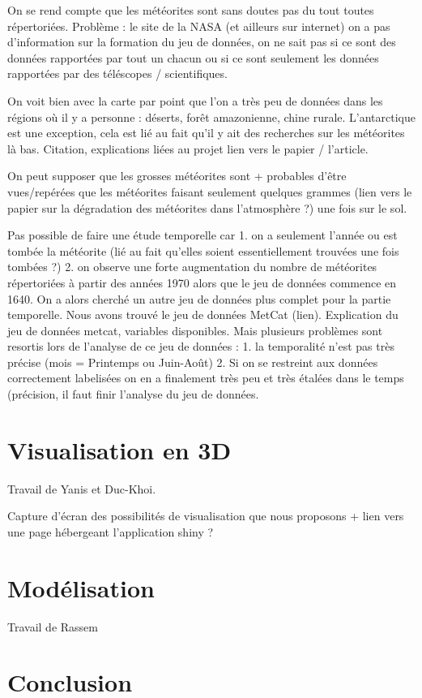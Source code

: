 \documentclass[12pt]{article}
\begin{document}
On se rend compte que les météorites sont sans doutes pas du tout toutes répertoriées. Problème : le site de la NASA (et ailleurs sur internet) on a pas d'information sur la formation du jeu de données, on ne sait pas si ce sont des données rapportées par tout un chacun ou si ce sont seulement les données rapportées par des téléscopes / scientifiques. 

On voit bien avec la carte par point que l'on a très peu de données dans les régions où il y a personne : déserts, forêt amazonienne, chine rurale. L'antarctique est une exception, cela est lié au fait qu'il y ait des recherches sur les météorites là bas. Citation, explications liées au projet lien vers le papier / l'article.

On peut supposer que les grosses météorites sont + probables d'être vues/repérées que les météorites faisant seulement quelques grammes (lien vers le papier sur la dégradation des météorites dans l'atmosphère ?) une fois sur le sol.

Pas possible de faire une étude temporelle car 1. on a seulement l'année ou est tombée la météorite (lié au fait qu'elles soient essentiellement trouvées une fois tombées ?) 2. on observe une forte augmentation du nombre de météorites répertoriées à partir des années 1970 alors que le jeu de données commence en 1640. On a alors cherché un autre jeu de données plus complet pour la partie temporelle. Nous avons trouvé le jeu de données MetCat (lien). Explication du jeu de données metcat, variables disponibles. Mais plusieurs problèmes sont resortis lors de l'analyse de ce jeu de données : 1. la temporalité n'est pas très précise (mois =  Printemps ou Juin-Août) 2. Si on se restreint aux données correctement labelisées on en a finalement très peu et très étalées dans le temps (précision, il faut finir l'analyse du jeu de données.


\section{Visualisation en 3D}
Travail de Yanis et Duc-Khoi.

Capture d'écran des possibilités de visualisation que nous proposons + lien vers une page hébergeant l'application shiny ?

\section{Modélisation}
Travail de Rassem

\section{Conclusion}
\end{document}
